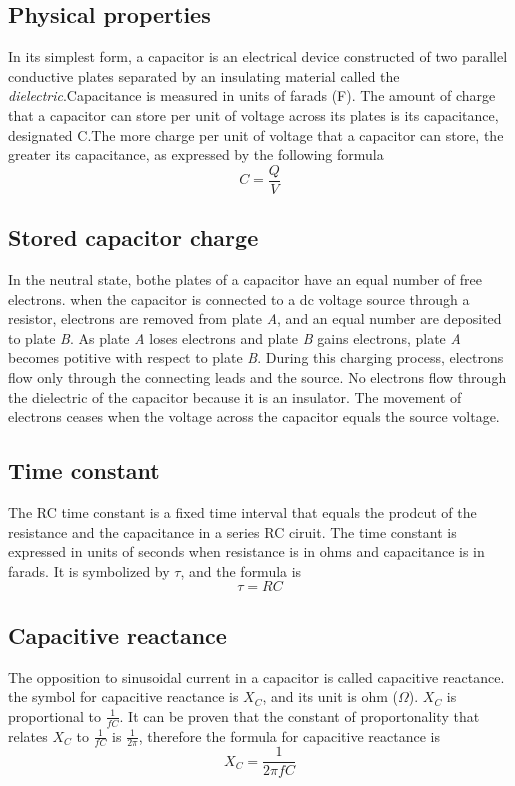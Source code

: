 \subsection{Physical properties}
In its simplest form, a capacitor is an electrical device constructed of two parallel conductive plates separated by an insulating material called the \emph{dielectric}.Capacitance is measured in units of farads (F). The amount of charge that a capacitor can store per unit of voltage across its plates is its capacitance, designated C.The more charge per unit of voltage that a capacitor can store, the greater its capacitance, as expressed by the following formula 
\[C=\frac{Q}{V}\]


\subsection{Stored capacitor charge}
In the neutral state, bothe plates of a capacitor have an equal number of free electrons. when the capacitor is connected to a dc voltage source through a resistor, electrons are removed from plate \emph{A}, and an equal number are deposited to plate \emph{B}. As plate \emph{A} loses electrons and plate \emph{B} gains electrons, plate \emph{A} becomes potitive with respect to plate \emph{B}. During this charging process, electrons flow only through the connecting leads and the source. No electrons flow through the dielectric of the capacitor because it is an insulator. The movement of electrons ceases when the voltage across the capacitor equals the source voltage.

\subsection{Time constant}
The RC time constant is a fixed time interval that equals the prodcut of the resistance and the capacitance in a series RC ciruit. The time constant is expressed in units of seconds when resistance is in ohms and capacitance is in farads. It is symbolized by $\tau$, and the formula is 
\[\tau = RC\]

\subsection{Capacitive reactance}
The opposition to sinusoidal current in a capacitor is called capacitive reactance. 
the symbol for capacitive reactance is $X_C$, and its unit is ohm ($\Omega$). 
$X_C$ is proportional to $\frac{1}{fC}$. It can be proven that the constant of proportonality that relates $X_C$ to $\frac{1}{fC}$ is $\frac{1}{2\pi}$, therefore the formula for capacitive reactance is 
\[X_C = \frac{1}{2\pi fC}\]

